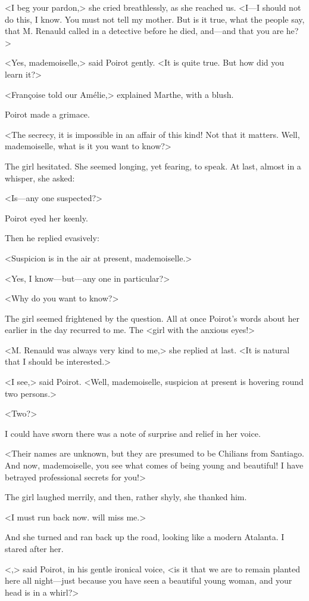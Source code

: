  <I beg your pardon,> she cried breathlessly, as she reached us. <I—I should not do this, I know. You must not tell my mother. But is it true, what the people say, that M. Renauld called in a detective before he died, and—and that you are he?> 

 <Yes, mademoiselle,> said Poirot gently. <It is quite true. But how did you learn it?> 

 <Françoise told our Amélie,> explained Marthe, with a blush. 

 Poirot made a grimace. 

 <The secrecy, it is impossible in an affair of this kind! Not that it matters. Well, mademoiselle, what is it you want to know?> 

 The girl hesitated. She seemed longing, yet fearing, to speak. At last, almost in a whisper, she asked: 

 <Is—any one suspected?> 

 Poirot eyed her keenly. 

 Then he replied evasively: 

 <Suspicion is in the air at present, mademoiselle.> 

 <Yes, I know—but—any one in particular?> 

 <Why do you want to know?> 

 The girl seemed frightened by the question. All at once Poirot's words about her earlier in the day recurred to me. The <girl with the anxious eyes!> 

 <M. Renauld was always very kind to me,> she replied at last. <It is natural that I should be interested.> 

 <I see,> said Poirot. <Well, mademoiselle, suspicion at present is hovering round two persons.> 

 <Two?> 

 I could have sworn there was a note of surprise and relief in her voice. 

 <Their names are unknown, but they are presumed to be Chilians from Santiago. And now, mademoiselle, you see what comes of being young and beautiful! I have betrayed professional secrets for you!> 

 The girl laughed merrily, and then, rather shyly, she thanked him. 

 <I must run back now.  will miss me.> 

 And she turned and ran back up the road, looking like a modern Atalanta. I stared after her. 

 <,> said Poirot, in his gentle ironical voice, <is it that we are to remain planted here all night—just because you have seen a beautiful young woman, and your head is in a whirl?> 


